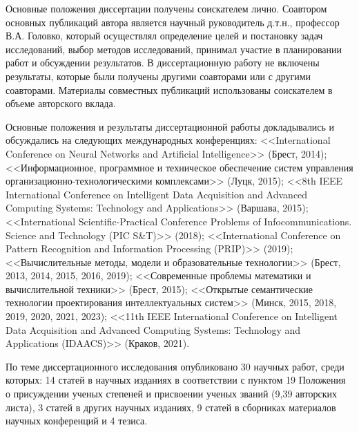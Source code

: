 \vspace{3mm}
\contribution
\vspace{3mm}

Основные положения диссертации получены соискателем лично. Соавтором основных публикаций автора является научный руководитель д.т.н., профессор В.А. Головко, который осуществлял определение целей и постановку задач исследований, выбор методов исследований, принимал участие в планировании работ и обсуждении результатов. В диссертационную работу не включены результаты, которые были получены другими соавторами или с другими соавторами. Материалы совместных публикаций использованы соискателем в объеме авторского вклада.

\vspace{3mm}
\probation
\vspace{3mm}

Основные положения и результаты диссертационной работы докладывались и обсуждались на следующих международных конференциях: <<International Conference on Neural Networks and Artificial Intelligence>> (Брест, 2014); <<Информационное, программное и техническое обеспечение систем управления организационно-технологическими комплексами>> (Луцк, 2015); <<8th IEEE International Conference on Intelligent Data Acquisition and Advanced Computing Systems: Technology and Applications>> (Варшава, 2015); <<International Scientific-Practical Conference Problems of Infocommunications. Science and Technology (PIC S\&T)>> (2018); <<International Conference on Pattern Recognition and Information Processing (PRIP)>> (2019); <<Вычислительные методы, модели и образовательные технологии>> (Брест, 2013, 2014, 2015, 2016, 2019); <<Современные проблемы математики и вычислительной техники>> (Брест, 2015); <<Открытые семантические технологии проектирования интеллектуальных систем>> (Минск, 2015, 2018, 2019, 2020, 2021, 2023); <<11th IEEE International Conference on Intelligent Data Acquisition and Advanced Computing Systems: Technology and Applications (IDAACS)>> (Краков, 2021).



\vspace{3mm}
\publications
\vspace{3mm}

По теме диссертационного исследования опубликовано 30 научных работ, среди которых: 14 статей в научных изданиях в соответствии с пунктом 19 Положения о присуждении ученых степеней и присвоении ученых званий (9,39 авторских листа), 3 статей в других научных изданиях, 9 статей в сборниках материалов научных конференций и 4 тезиса.

